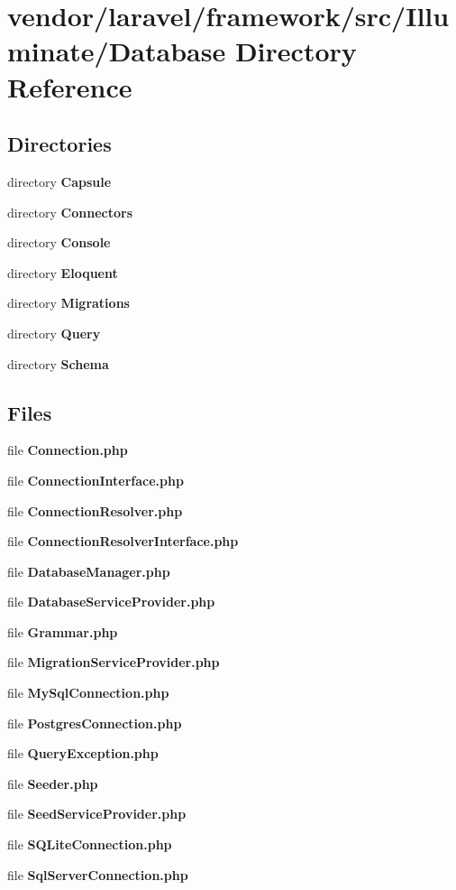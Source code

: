 \section{vendor/laravel/framework/src/\+Illuminate/\+Database Directory Reference}
\label{dir_76310cff50f47ee052012a5e37c16c2e}
\subsection*{Directories}
\begin{DoxyCompactItemize}
\item 
directory {\bf Capsule}
\item 
directory {\bf Connectors}
\item 
directory {\bf Console}
\item 
directory {\bf Eloquent}
\item 
directory {\bf Migrations}
\item 
directory {\bf Query}
\item 
directory {\bf Schema}
\end{DoxyCompactItemize}
\subsection*{Files}
\begin{DoxyCompactItemize}
\item 
file {\bf Connection.\+php}
\item 
file {\bf Connection\+Interface.\+php}
\item 
file {\bf Connection\+Resolver.\+php}
\item 
file {\bf Connection\+Resolver\+Interface.\+php}
\item 
file {\bf Database\+Manager.\+php}
\item 
file {\bf Database\+Service\+Provider.\+php}
\item 
file {\bf Grammar.\+php}
\item 
file {\bf Migration\+Service\+Provider.\+php}
\item 
file {\bf My\+Sql\+Connection.\+php}
\item 
file {\bf Postgres\+Connection.\+php}
\item 
file {\bf Query\+Exception.\+php}
\item 
file {\bf Seeder.\+php}
\item 
file {\bf Seed\+Service\+Provider.\+php}
\item 
file {\bf S\+Q\+Lite\+Connection.\+php}
\item 
file {\bf Sql\+Server\+Connection.\+php}
\end{DoxyCompactItemize}
